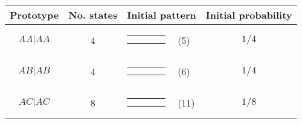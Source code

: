 \begin{center}
\begin{tabular}{ccrlc} \hline
Prototype & No. states & \multicolumn{2}{c}{Initial pattern} & Initial probability \\ \hline
$AA|AA$ & 4 & 
{\renewcommand{\arraystretch}{0.3}
\renewcommand{\tabcolsep}{0.5mm}
\parbox[b][3mm][c]{12mm}{
\begin{tabular}{|p{2mm}|p{2mm}||p{2mm}|p{2mm}|} \hline
$\bullet$ &           &           &           \\
$\bullet$ &           &           &           \\ \hline
\end{tabular}}}
& (5) & $1/4$ \\
$AB|AB$ & 4 & 
{\renewcommand{\arraystretch}{0.3}
\renewcommand{\tabcolsep}{0.5mm}
\parbox[b][3mm][c]{12mm}{
\begin{tabular}{|p{2mm}|p{2mm}||p{2mm}|p{2mm}|} \hline
$\bullet$ &           &           &           \\
          & $\bullet$ &           &           \\ \hline
\end{tabular}}}
& (6) & $1/4$ \\
$AC|AC$ & 8 & 
{\renewcommand{\arraystretch}{0.3}
\renewcommand{\tabcolsep}{0.5mm}
\parbox[b][3mm][c]{12mm}{
\begin{tabular}{|p{2mm}|p{2mm}||p{2mm}|p{2mm}|} \hline
$\bullet$ &           &           &           \\
          &           & $\bullet$ &           \\ \hline
\end{tabular}}}
& (11) & $1/8$ \\
\hline
\end{tabular}
\end{center}
